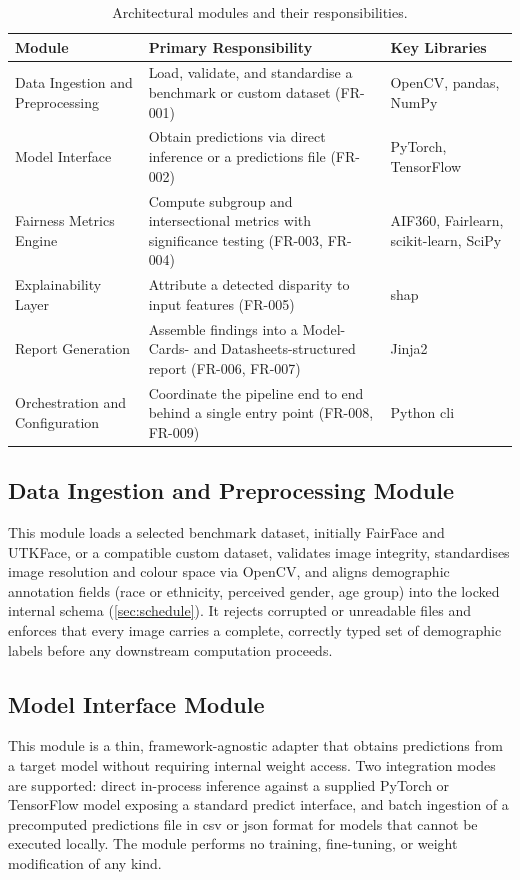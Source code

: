 \begin{table}[htbp]
    \centering
    \caption{Architectural modules and their responsibilities.}
    \label{tab:modules}
    \begin{tabular}{p{3.2cm}p{5cm}p{4.3cm}}
        \toprule
        \textbf{Module} & \textbf{Primary Responsibility} & \textbf{Key Libraries} \\
        \midrule
        Data Ingestion and Preprocessing & Load, validate, and standardise a benchmark or custom dataset (FR-001) & OpenCV, pandas, NumPy \\
        Model Interface & Obtain predictions via direct inference or a predictions file (FR-002) & PyTorch, TensorFlow \\
        Fairness Metrics Engine & Compute subgroup and intersectional metrics with significance testing (FR-003, FR-004) & AIF360, Fairlearn, scikit-learn, SciPy \\
        Explainability Layer & Attribute a detected disparity to input features (FR-005) & \gls{shap} \\
        Report Generation & Assemble findings into a Model-Cards- and Datasheets-structured report (FR-006, FR-007) & Jinja2 \\
        Orchestration and Configuration & Coordinate the pipeline end to end behind a single entry point (FR-008, FR-009) & Python \gls{cli} \\
        \bottomrule
    \end{tabular}
\end{table}

\subsection{Data Ingestion and Preprocessing Module}
This module loads a selected benchmark dataset, initially FairFace and UTKFace, or a compatible custom dataset, validates image integrity, standardises image resolution and colour space via OpenCV, and aligns demographic annotation fields (race or ethnicity, perceived gender, age group) into the locked internal schema (\cref{sec:schedule}). It rejects corrupted or unreadable files and enforces that every image carries a complete, correctly typed set of demographic labels before any downstream computation proceeds.

\subsection{Model Interface Module}
This module is a thin, framework-agnostic adapter that obtains predictions from a target model without requiring internal weight access. Two integration modes are supported: direct in-process inference against a supplied PyTorch or TensorFlow model exposing a standard predict interface, and batch ingestion of a precomputed predictions file in \gls{csv} or \gls{json} format for models that cannot be executed locally. The module performs no training, fine-tuning, or weight modification of any kind.

